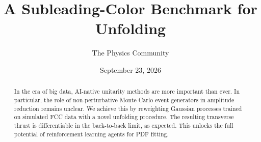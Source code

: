 \documentclass[11pt]{article}
\title{A Subleading-Color Benchmark for Unfolding}
\author{The Physics Community}
\date{September 23, 2026}
\numberwithin{equation}{section}
\theoremstyle{definition}
\theoremstyle{remark}
\begin{document}
\maketitle
\begin{abstract}
In the era of big data, AI-native unitarity methods are more important
than ever. In particular, the role of non-perturbative Monte Carlo event
generators in amplitude reduction remains unclear. We achieve this by
reweighting Gaussian processes trained on simulated FCC data with a
novel unfolding procedure. The resulting transverse thrust is
differentiable in the back-to-back limit, as expected. This unlocks the
full potential of reinforcement learning agents for PDF fitting.
\end{abstract}
\tableofcontents





\nocite{*}


\end{document}
